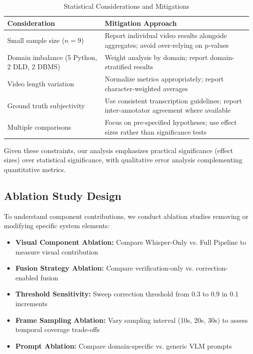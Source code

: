 \begin{table}[h]
\centering
\caption{Statistical Considerations and Mitigations}
\label{tab:statistical_considerations}
\begin{tabular}{|p{3.5cm}|p{8cm}|}
\hline
\textbf{Consideration} & \textbf{Mitigation Approach} \\
\hline
Small sample size ($n=9$) & Report individual video results alongside aggregates; avoid over-relying on p-values \\
\hline
Domain imbalance (5 Python, 2 DLD, 2 DBMS) & Weight analysis by domain; report domain-stratified results \\
\hline
Video length variation & Normalize metrics appropriately; report character-weighted averages \\
\hline
Ground truth subjectivity & Use consistent transcription guidelines; report inter-annotator agreement where available \\
\hline
Multiple comparisons & Focus on pre-specified hypotheses; use effect sizes rather than significance tests \\
\hline
\end{tabular}
\end{table}

Given these constraints, our analysis emphasizes practical significance (effect sizes) over statistical significance, with qualitative error analysis complementing quantitative metrics.

\subsection{Ablation Study Design}

To understand component contributions, we conduct ablation studies removing or modifying specific system elements:

\begin{itemize}
    \item \textbf{Visual Component Ablation:} Compare Whisper-Only vs. Full Pipeline to measure visual contribution
    \item \textbf{Fusion Strategy Ablation:} Compare verification-only vs. correction-enabled fusion
    \item \textbf{Threshold Sensitivity:} Sweep correction threshold from 0.3 to 0.9 in 0.1 increments
    \item \textbf{Frame Sampling Ablation:} Vary sampling interval (10s, 20s, 30s) to assess temporal coverage trade-offs
    \item \textbf{Prompt Ablation:} Compare domain-specific vs. generic VLM prompts
\end{itemize}

